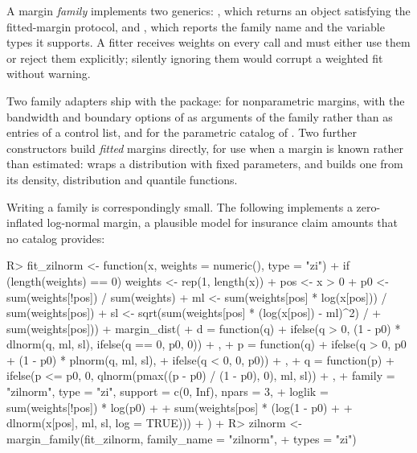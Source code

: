 \documentclass[article]{jss}
\begin{document}
A margin \emph{family} implements two generics: , which returns an object satisfying the fitted-margin protocol,
and , which reports the family name and the variable
types it supports.  A fitter receives weights on every call and must either use
them or reject them explicitly; silently ignoring them would corrupt a weighted
fit without warning.

Two family adapters ship with the package:  for
nonparametric margins, with the bandwidth and boundary options of 
as arguments of the family rather than as entries of a control list, and
 for the parametric catalog of
.  Two further constructors build \emph{fitted} margins
directly, for use when a margin is known rather than estimated:
 wraps a  distribution with fixed parameters,
and  builds one from its density, distribution and
quantile functions.

Writing a family is correspondingly small.  The following implements a
zero-inflated log-normal margin, a plausible model for insurance claim
amounts that no catalog provides:

\begin{CodeChunk}
\begin{CodeInput}
R> fit_zilnorm <- function(x, weights = numeric(), type = "zi") {
+    if (length(weights) == 0) weights <- rep(1, length(x))
+    pos <- x > 0
+    p0 <- sum(weights[!pos]) / sum(weights)
+    ml <- sum(weights[pos] * log(x[pos])) / sum(weights[pos])
+    sl <- sqrt(sum(weights[pos] * (log(x[pos]) - ml)^2) /
+               sum(weights[pos]))
+    margin_dist(
+      d = function(q) {
+        ifelse(q > 0, (1 - p0) * dlnorm(q, ml, sl), ifelse(q == 0, p0, 0))
+      },
+      p = function(q) {
+        ifelse(q > 0, p0 + (1 - p0) * plnorm(q, ml, sl),
+               ifelse(q < 0, 0, p0))
+      },
+      q = function(p) {
+        ifelse(p <= p0, 0, qlnorm(pmax((p - p0) / (1 - p0), 0), ml, sl))
+      },
+      family = "zilnorm", type = "zi", support = c(0, Inf), npars = 3,
+      loglik = sum(weights[!pos]) * log(p0) +
+        sum(weights[pos] * (log(1 - p0) +
+                            dlnorm(x[pos], ml, sl, log = TRUE)))
+    )
+  }
R> zilnorm <- margin_family(fit_zilnorm, family_name = "zilnorm",
+    types = "zi")
\end{CodeInput}
\end{CodeChunk}
\end{document}
